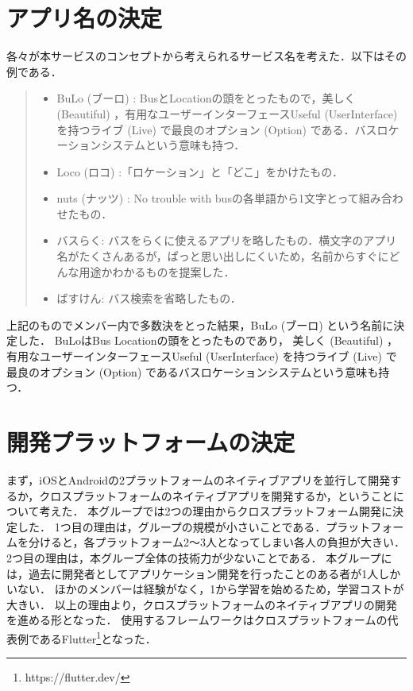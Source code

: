 \section{アプリ名の決定}
各々が本サービスのコンセプトから考えられるサービス名を考えた．以下はその例である．
\begin{quote}
    \begin{itemize}
        \item BuLo (ブーロ) : BusとLocationの頭をとったもので，美しく (Beautiful) ，有用なユーザーインターフェースUseful (UserInterface) を持つライブ (Live) で最良のオプション (Option) である．バスロケーションシステムという意味も持つ．
        \item Loco (ロコ) :「ロケーション」と「どこ」をかけたもの．
        \item nuts (ナッツ) : No trouble with busの各単語から1文字とって組み合わせたもの．
        \item バスらく: バスをらくに使えるアプリを略したもの．横文字のアプリ名がたくさんあるが，ぱっと思い出しにくいため，名前からすぐにどんな用途かわかるものを提案した．
        \item ばすけん: バス検索を省略したもの．
    \end{itemize}
\end{quote}
上記のものでメンバー内で多数決をとった結果，BuLo (ブーロ) という名前に決定した．
BuLoはBus Locationの頭をとったものであり，
美しく (Beautiful) ，有用なユーザーインターフェースUseful (UserInterface) を持つライブ (Live) で最良のオプション (Option) であるバスロケーションシステムという意味も持つ．

\section{開発プラットフォームの決定}
まず，iOSとAndroidの2プラットフォームのネイティブアプリを並行して開発するか，クロスプラットフォームのネイティブアプリを開発するか，ということについて考えた．
本グループでは2つの理由からクロスプラットフォーム開発に決定した．
1つ目の理由は，グループの規模が小さいことである．プラットフォームを分けると，各プラットフォーム2〜3人となってしまい各人の負担が大きい．
2つ目の理由は，本グループ全体の技術力が少ないことである．
本グループには，過去に開発者としてアプリケーション開発を行ったことのある者が1人しかいない．
ほかのメンバーは経験がなく，1から学習を始めるため，学習コストが大きい．
以上の理由より，クロスプラットフォームのネイティブアプリの開発を進める形となった．
使用するフレームワークはクロスプラットフォームの代表例であるFlutter\footnote{https://flutter.dev/}となった．

